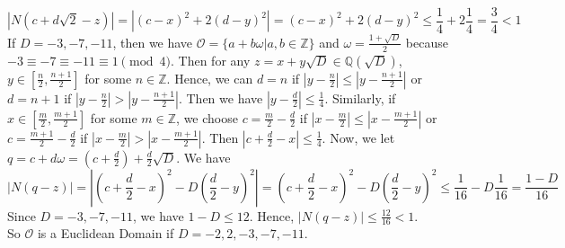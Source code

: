 \documentclass[12pt]{amsart}
\newcommand{\Q}{\mathbb{Q}}
\newcommand{\Z}{\mathbb{Z}}
\begin{document}
\[|N(c+d\sqrt{2}-z)|=|(c-x)^2+2(d-y)^2|= (c-x)^2+2(d-y)^2\leq \frac{1}{4}+2\frac{1}{4}=\frac{3}{4}<1\]
If $D=-3,-7,-11$, then we have $\mathcal{O}=\{a+b\omega|a,b\in\Z\}$ and $\omega=\frac{1+\sqrt{D}}{2}$ because $-3\equiv-7\equiv-11\equiv 1 \pmod{4}$. Then for any $z=x+y\sqrt{D}\in \Q(\sqrt{D})$, $y\in[\frac{n}{2},\frac{n+1}{2}]$ for some $n\in \Z$. Hence, we can $d=n$ if $|y-\frac{n}{2}|\leq |y-\frac{n+1}{2}|$ or $d=n+1$ if $|y-\frac{n}{2}|>|y-\frac{n+1}{2}|$. Then we have $|y-\frac{d}{2}|\leq \frac{1}{4}$. Similarly, if $x\in [\frac{m}{2},\frac{m+1}{2}]$ for some $m\in \Z$, we choose $c=\frac{m}{2}-\frac{d}{2}$ if $|x-\frac{m}{2}|\leq |x-\frac{m+1}{2}|$ or $c=\frac{m+1}{2}-\frac{d}{2}$ if $|x-\frac{m}{2}|>|x-\frac{m+1}{2}|$. Then $|c+\frac{d}{2}-x|\leq \frac{1}{4}$. Now, we let $q=c+d\omega=(c+\frac{d}{2})+\frac{d}{2}\sqrt{D}$. We have 
\[|N(q-z)|=|(c+\frac{d}{2}-x)^2-D(\frac{d}{2}-y)^2|=(c+\frac{d}{2}-x)^2-D(\frac{d}{2}-y)^2\leq \frac{1}{16}-D\frac{1}{16}=\frac{1-D}{16}\]
Since $D=-3,-7,-11$, we have $1-D\leq 12$. Hence, $|N(q-z)|\leq \frac{12}{16}<1$.\\
So $\mathcal{O}$ is a Euclidean Domain if $D=-2,2,-3,-7,-11$.
\end{document}
